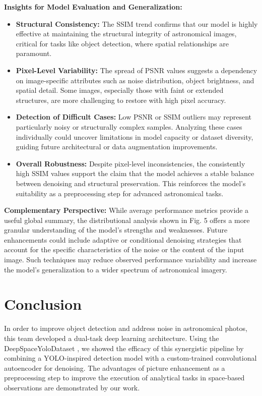\documentclass[12pt, conference]{IEEEtran}
\begin{document}
\textbf{Insights for Model Evaluation and Generalization:}
\begin{itemize}
\item \textbf{Structural Consistency:} The SSIM \cite{wang2004image} trend confirms that our model is highly effective at maintaining the structural integrity of astronomical images, critical for tasks like object detection, where spatial relationships are paramount.
\item \textbf{Pixel-Level Variability:} The spread of PSNR \cite{hore2010image} values suggests a dependency on image-specific attributes such as noise distribution, object brightness, and spatial detail. Some images, especially those with faint or extended structures, are more challenging to restore with high pixel accuracy.

\item \textbf{Detection of Difficult Cases:} Low PSNR \cite{hore2010image} or SSIM \cite{wang2004image} outliers may represent particularly noisy or structurally complex samples. Analyzing these cases individually could uncover limitations in model capacity or dataset diversity, guiding future architectural or data augmentation improvements.

\item \textbf{Overall Robustness:} Despite pixel-level inconsistencies, the consistently high SSIM \cite{wang2004image} values support the claim that the model achieves a stable balance between denoising and structural preservation. This reinforces the model’s suitability as a preprocessing step for advanced astronomical tasks.
\end{itemize}
\textbf{Complementary Perspective:}
While average performance metrics provide a useful global summary, the distributional analysis shown in Fig. 5 offers a more granular understanding of the model’s strengths and weaknesses. Future enhancements could include adaptive or conditional denoising strategies that account for the specific characteristics of the noise or the content of the input image. Such techniques may reduce observed performance variability and increase the model's generalization to a wider spectrum of astronomical imagery.
\section{Conclusion}
In order to improve object detection and address noise in astronomical photos, this team developed a dual-task deep learning architecture. Using the DeepSpaceYoloDataset \cite{deepspaceyolo}, we showed the efficacy of this synergistic pipeline by combining a YOLO-inspired \cite{redmon2016you} detection model with a custom-trained convolutional autoencoder for denoising. The advantages of picture enhancement as a preprocessing step to improve the execution of analytical tasks in space-based observations are demonstrated by our work.
\end{document}
